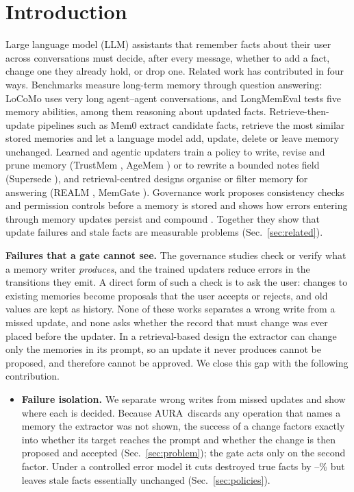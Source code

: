 \IfFileExists{IEEEtran.cls}{\documentclass[journal]{IEEEtran}\def\HAVEIEEE{1}}{\documentclass[10pt,twocolumn]{article}\usepackage[margin=0.7in,columnsep=0.25in]{geometry}}
\newcommand{\aura}{AURA}
\begin{document}
\section{Introduction}
Large language model (LLM) assistants that remember facts about their user across conversations must decide, after every message, whether to add a fact, change one they already hold, or drop one. Related work has contributed in four ways. Benchmarks measure long-term memory through question answering: LoCoMo \cite{maharana2024locomo} uses very long agent--agent conversations, and LongMemEval \cite{wu2024longmemeval} tests five memory abilities, among them reasoning about updated facts. Retrieve-then-update pipelines such as Mem0 \cite{chhikara2025mem0} extract candidate facts, retrieve the most similar stored memories and let a language model add, update, delete or leave memory unchanged. Learned and agentic updaters train a policy to write, revise and prune memory (TrustMem \cite{yang2026trustmem}, AgeMem \cite{yu2026agemem}) or to rewrite a bounded notes field (Supersede \cite{patel2026supersede}), and retrieval-centred designs organise or filter memory for answering (REALM \cite{song2026realm}, MemGate \cite{zhang2026memgate}). Governance work proposes consistency checks and permission controls before a memory is stored \cite{lam2026ssgm} and shows how errors entering through memory updates persist and compound \cite{xiong2025memory,xiao2026errors}. Together they show that update failures and stale facts are measurable problems (Sec.~\ref{sec:related}).

\textbf{Failures that a gate cannot see.} The governance studies check or verify what a memory writer \emph{produces}, and the trained updaters reduce errors in the transitions they emit. A direct form of such a check is to ask the user: changes to existing memories become proposals that the user accepts or rejects, and old values are kept as history. None of these works separates a wrong write from a missed update, and none asks whether the record that must change was ever placed before the updater. In a retrieval-based design the extractor can change only the memories in its prompt, so an update it never produces cannot be proposed, and therefore cannot be approved. We close this gap with the following contribution.
\begin{itemize}
\item \textbf{Failure isolation.} We separate wrong writes from missed updates and show where each is decided. Because \aura\ discards any operation that names a memory the extractor was not shown, the success of a change factors exactly into whether its target reaches the prompt and whether the change is then proposed and accepted (Sec.~\ref{sec:problem}); the gate acts only on the second factor. Under a controlled error model it cuts destroyed true facts by \destroyRedMin--\destroyRedMax\% but leaves stale facts essentially unchanged (Sec.~\ref{sec:policies}).
\end{itemize}
\end{document}
